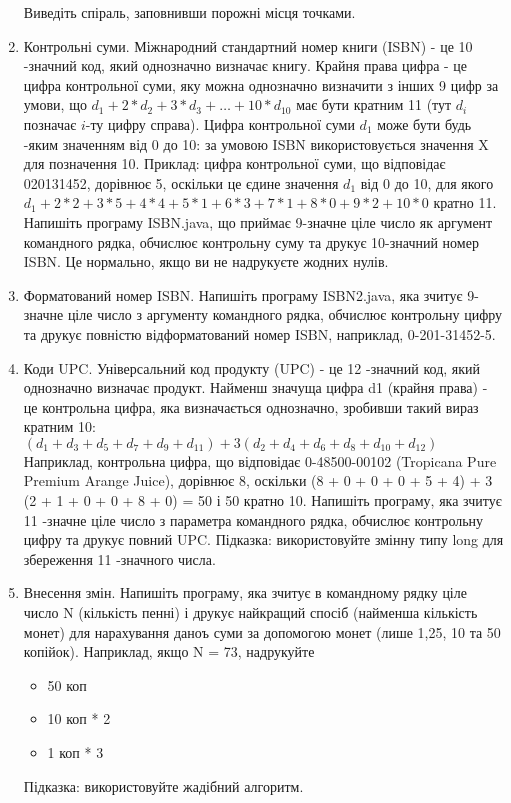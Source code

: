 \documentclass[]{article}
\begin{document}
\begin{enumerate}
Виведіть спіраль, заповнивши порожні місця точками.


\item Контрольні суми.
Міжнародний стандартний номер книги (ISBN) - це 10 -значний код, який однозначно визначає книгу.
Крайня права цифра - це цифра контрольної суми, яку можна однозначно визначити з інших 9 цифр за умови,
що $d_{1} + 2*d_{2} + 3*d_{3} + \ldots + 10*d_{10}$ має бути кратним 11 (тут $d_{i}$ позначає $i$-ту цифру справа).
 Цифра контрольної суми $d_1$ може бути будь -яким значенням від 0 до 10:
за умовою ISBN використовується значення X для позначення 10.
Приклад: цифра контрольної суми, що відповідає 020131452, дорівнює 5, оскільки це єдине значення $d_1$ від 0 до 10,
для якого $d_1 + 2*2 + 3*5 + 4*4 + 5*1 + 6*3 + 7*1 + 8*0 + 9*2 + 10*0$ кратно 11.
 Напишіть програму ISBN.java, що приймає 9-значне ціле число як аргумент командного рядка, обчислює контрольну суму та
 друкує 10-значний номер ISBN. Це нормально, якщо ви не надрукуєте жодних нулів.

\item Форматований номер ISBN.
Напишіть програму ISBN2.java, яка зчитує 9-значне ціле число з аргументу командного рядка,
обчислює контрольну цифру та друкує повністю відформатований номер ISBN, наприклад, 0-201-31452-5.

\item   <200b><200b>Коди UPC. Універсальний код продукту (UPC) - це 12 -значний код, який однозначно визначає продукт.
Найменш значуща цифра d1 (крайня права) - це контрольна цифра, яка визначається однозначно, зробивши такий вираз кратним 10:
$(d_1 + d_3 + d_5 + d_7 + d_9 + d_{11}) + 3 (d_2 + d_4 + d_6 + d_8 + d_{10} + d_{12})$
Наприклад, контрольна цифра, що відповідає 0-48500-00102 (Tropicana Pure Premium Arange Juice), дорівнює 8, оскільки
(8 + 0 + 0 + 0 + 5 + 4) + 3 (2 + 1 + 0 + 0 + 8 + 0) = 50
і 50 кратно 10.
Напишіть програму, яка зчитує 11 -значне ціле число з параметра командного рядка,
обчислює контрольну цифру та друкує повний UPC.
Підказка: використовуйте змінну типу long для збереження 11 -значного числа.

\item Внесення змін. Напишіть програму, яка зчитує в командному рядку ціле число N (кількість пенні) і друкує найкращий спосіб
(найменша кількість монет) для нарахування даноъ суми за допомогою монет (лише 1,25, 10 та 50 копійок).
Наприклад, якщо N = 73, надрукуйте
\begin{itemize}
\item  50 коп
\item  10 коп * 2
\item  1 коп * 3
\end{itemize}
Підказка: використовуйте жадібний алгоритм. 


\end{enumerate}
\end{document}
